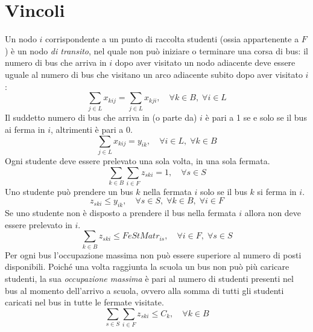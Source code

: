 \section{Vincoli}
\label{sec:constraints}
Un nodo $i$ corrispondente a un punto di raccolta studenti (ossia appartenente a $F$) è un nodo \textit{di transito}, nel quale non può iniziare o terminare una corsa di bus: il numero di bus che arriva in $i$ dopo aver visitato un nodo adiacente deve essere uguale al numero di bus che visitano un arco adiacente subito dopo aver visitato $i$:
\begin{equation}
    \sum_{j \in L} x_{kij} = \sum_{j \in L} x_{kji},\quad \forall k \in B,\;\forall i \in L
\end{equation}
Il suddetto numero di bus che arriva in (o parte da) $i$ è pari a 1 se e solo se il bus ai ferma in $i$, altrimenti è pari a 0.
\begin{equation}
    \sum_{j \in L} x_{kij} = y_{ik},\quad \forall i \in L,\; \forall k \in B 
\end{equation}
Ogni studente deve essere prelevato una sola volta, in una sola fermata.
\begin{equation}
    \sum_{k \in B}\sum_{i \in F} z_{ski} = 1,\quad \forall s \in S
\end{equation}
Uno studente può prendere un bus $k$ nella fermata $i$ solo se il bus $k$ si ferma in $i$.
\begin{equation}
    z_{ski} \leq y_{ik},\quad \forall s \in S,\;\forall k \in B,\;\forall i \in F
\end{equation}
Se uno studente non è disposto a prendere il bus nella fermata $i$ allora non deve essere prelevato in $i$.
\begin{equation}
    \sum_{k \in B} z_{ski} \leq FeStMatr_{is},\quad \forall i \in F,\;\forall s \in S
\end{equation}
Per ogni bus l'occupazione massima non può essere superiore al numero di posti disponibili. Poiché una volta raggiunta la scuola un bus non può più caricare studenti, la sua \textit{occupazione massima} è pari al numero di studenti presenti nel bus al momento dell'arrivo a scuola, ovvero alla somma di tutti gli studenti caricati nel bus in tutte le fermate visitate. 
\begin{equation}
    \sum_{s \in S}\sum_{i \in F}z_{ski} \leq C_{k},\quad \forall k \in B
\end{equation}
